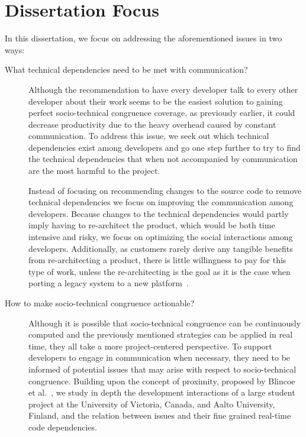 \section{Dissertation Focus}
In this dissertation, we focus on addressing the aforementioned issues in two ways:
\begin{description}
\item[What technical dependencies need to be met with communication?] 
Although the recommendation to have every developer talk to every other developer about their work seems to be the easiest solution to gaining perfect socio-technical congruence coverage, as previously earlier, it could decrease productivity due to the heavy overhead caused by  constant communication.
To address this issue, we seek out which technical dependencies exist among developers and go one step further to try to find the technical dependencies that when not accompanied by communication are the most harmful to the project.

Instead of focusing on recommending changes to the source code to remove technical dependencies we focus on improving the communication among developers.
Because changes to the technical dependencies would partly imply having to re-architect the product, which would be both time intensive and risky, we focus on optimizing the social interactions among developers.
Additionally, as customers rarely derive any tangible benefits from re-architecting a product, there is little willingness to pay for this type of work, unless the re-architecting is the goal as it is the case when porting a legacy system to a new platform~\cite{klinger:mtd:2011}.

\item[How to make socio-technical congruence actionable?] Although it is possible that socio-technical congruence can be continuously computed and the previously mentioned strategies can be applied in real time, they all take a more project-centered perspective.
To support developers to engage in communication when necessary, they need to be informed of potential issues that may arise with respect to socio-technical congruence.
Building upon the concept of proximity, proposed by Blincoe et al.~\cite{blincoe:cscw:2012}, we study in depth the development interactions of a large student project at the University of Victoria, Canada, and Aalto University, Finland, and the relation between issues and their fine grained real-time code dependencies.
\end{description}

